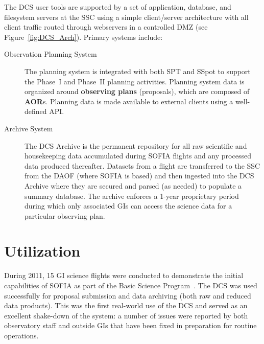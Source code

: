 The DCS user tools are supported by a set of application, database, and filesystem servers at the SSC using a simple client/server architecture with all client traffic routed through webservers in a controlled DMZ (see Figure~\ref{fig:DCS_Arch}).  Primary systems include:


\begin{description}


\item[Observation Planning System] The planning system is integrated with both SPT and SSpot to support the Phase~I and Phase~II planning activities.  Planning system data is organized around {\bf observing plans} (proposals), which are composed of {\bf AOR}s.  Planning data is made available to external clients \citep[e.g. Flight Management Infrastructure,][]{Gross:2009} using a well-defined API.  

\item[Archive System] The DCS Archive is the permanent repository for all raw scientific and housekeeping data accumulated during SOFIA flights and any processed data produced thereafter. Datasets from a flight are transferred to the SSC from the DAOF (where SOFIA is based) and then ingested into the DCS Archive where they are secured and parsed (as needed) to populate a summary database.  The archive enforces a 1-year proprietary period during which only associated GIs can access the science data for a particular observing plan.

\end{description}



\section{Utilization}

During 2011, 15 GI science flights were conducted to demonstrate the initial capabilities of SOFIA as part of the Basic Science Program~\citep{Young:2012}.  The DCS was used successfully for proposal submission and data archiving (both raw and reduced data products).  This was the first real-world use of the DCS and served as an excellent shake-down of the system:  a number of issues were reported by both observatory staff and outside GIs that have been fixed in preparation for routine operations.



